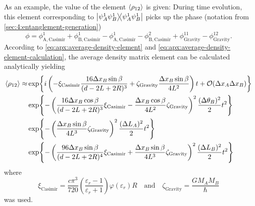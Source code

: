 As an example, the value of the element $\left\langle\rho_{12}\right\rangle$ is given:
During time evolution, this element corresponding to $\ketbra{\psi_A^1\psi_B^1}{\psi_A^1\psi_B^1}$ picks up the phase (notation from \cref{sec:4:entanglement-generation})
\begin{equation}
  \phi = \phi^1_\mathrm{A,Casimir} + \phi^1_\mathrm{B,Casimir} - \phi^1_\mathrm{A,Casimir} - \phi^2_\mathrm{B,Casimir} + \phi^{11}_\mathrm{Gravity} - \phi^{12}_\mathrm{Gravity} .
\end{equation}
According to \eqref{eq:apx:average-density-element} and \eqref{eq:apx:average-density-element-calculation}, the average density matrix element can be calculated analytically yielding
\begin{align} \label{eq:apx:averagted-state-element}
  \left\langle\rho_{12}\right\rangle \approx & \exp{i \left( -\xi_\mathrm{Casimir}\frac{16\Delta x_B \sin\beta}{(d-2L+2R)^3} + \zeta_\mathrm{Gravity}\frac{\Delta x_B\sin\beta}{4L^2} \right) t + \mathcal{O}(\Delta x_A \Delta x_B)} \\
  & \exp{-\left(\frac{16\Delta x_B \cos\beta}{(d-2L+2R)^3}\xi_\mathrm{Casimir} - \frac{\Delta x_B \cos\beta}{4L^2}\zeta_\mathrm{Gravity}\right)^2 \frac{(\Delta \theta_B)^2}{2} t^2} \\
  & \exp{-\left(\frac{\Delta x_B \sin\beta}{4L^3}\zeta_\mathrm{Gravity}\right)^2 \frac{(\Delta L_A)^2}{2} t^2} \\
  & \exp{-\left(\frac{96\Delta x_B \sin\beta}{(d-2L+2R)^4}\xi_\mathrm{Casimir} + \frac{\Delta x_B \sin\beta}{4L^3}\zeta_\mathrm{Gravity}\right)^2 \frac{(\Delta L_B)^2}{2} t^2}
\end{align}
where
\begin{equation}
  \xi_\mathrm{Casimir} = \frac{c \pi^3}{720} \left(\frac{\varepsilon_r-1}{\varepsilon_r+1}\right) \varphi(\varepsilon_r) R
  \quad \text{and}\quad 
  \zeta_\mathrm{Gravity} = \frac{GM_AM_B}{\hbar}
\end{equation}
was used.

